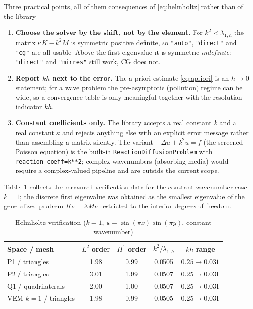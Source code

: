\documentclass[11pt,oneside]{book}
\theoremstyle{definition}
\theoremstyle{plain}
\newenvironment{important}{%
  \begin{tcolorbox}[colback=blue!5,colframe=blue!45,title=Key Point,fonttitle=\bfseries]%
}{%
  \end{tcolorbox}%
}
\newcommand{\code}[1]{\texttt{#1}}
\begin{document}
\begin{important}
Three practical points, all of them consequences of \eqref{eq:helmholtz} rather
than of the library.

\begin{enumerate}[label=(\arabic*),itemsep=0.2em]
  \item \textbf{Choose the solver by the shift, not by the element.} For
        $k^2<\lambda_{1,h}$ the matrix $\kappa K-k^2M$ is symmetric positive
        definite, so \code{"auto"}, \code{"direct"} and \code{"cg"} are all usable.
        Above the first eigenvalue it is symmetric \emph{indefinite}: \code{"direct"}
        and \code{"minres"} still work, CG does not.
  \item \textbf{Report $kh$ next to the error.} The a priori estimate
        \eqref{eq:apriori} is an $h\to0$ statement; for a wave problem the
        pre-asymptotic (pollution) regime can be wide, so a convergence table is
        only meaningful together with the resolution indicator $kh$.
  \item \textbf{Constant coefficients only.} The library accepts a real constant
        $k$ and a real constant $\kappa$ and rejects anything else with an explicit
        error message rather than assembling a matrix silently. The variant
        $-\Delta u+k^2u=f$ (the screened Poisson equation) is the built-in
        \code{ReactionDiffusionProblem} with \code{reaction\_\allowbreak coeff=k**2}; complex
        wavenumbers (absorbing media) would require a complex-valued pipeline and
        are outside the current scope.
\end{enumerate}
\end{important}

Table~\ref{tab:helmholtz-verification} collects the measured verification data for
the constant-wavenumber case $k=1$; the discrete first eigenvalue was obtained as
the smallest eigenvalue of the generalized problem $Kv=\lambda Mv$ restricted to
the interior degrees of freedom.

\begin{table}[htbp]
\centering
\caption{Helmholtz verification ($k=1$, $u=\sin(\pi x)\sin(\pi y)$, constant wavenumber)}
\label{tab:helmholtz-verification}
\begin{lrbox}{\guideTableBox}
\begin{tabular}{@{}lcccc@{}}
\toprule
Space / mesh & $L^2$ order & $H^1$ order & $k^2/\lambda_{1,h}$ & $kh$ range \\
\midrule
P1 / triangles    & 1.98 & 0.99 & 0.0505 & $0.25\to0.031$ \\
P2 / triangles    & 3.01 & 1.99 & 0.0507 & $0.25\to0.031$ \\
Q1 / quadrilaterals & 2.00 & 1.00 & 0.0507 & $0.25\to0.031$ \\
VEM $k=1$ / triangles & 1.98 & 0.99 & 0.0505 & $0.25\to0.031$ \\
\bottomrule
\end{tabular}
\end{lrbox}%
\ifdim\wd\guideTableBox>\linewidth
  \resizebox{\linewidth}{!}{\usebox{\guideTableBox}}%
\else\usebox{\guideTableBox}\fi
\end{table}
\end{document}

